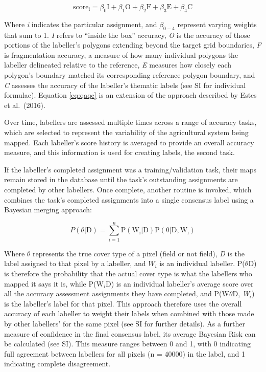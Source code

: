\documentclass[11pt,a4paper]{article}
\begin{document}
\begin{equation} \label{eq:qaqc}
\mathrm{score_i}=\beta_0\mathrm{I}+\beta_1\mathrm{O}+\beta_2\mathrm{F}+\beta_3\mathrm{E}+\beta_4\mathrm{C}
\end{equation}

Where \emph{i} indicates the particular assignment, and \(\beta_{0-4}\)
represent varying weights that sum to 1. \emph{I} refers to ``inside the
box'' accuracy, \emph{O} is the accuracy of those portions of the
labeller's polygons extending beyond the target grid boundaries,
\emph{F} is fragmentation accuracy, a measure of how many individual
polygons the labeller delineated relative to the reference, \emph{E}
measures how closely each polygon's boundary matched its corresponding
reference polygon boundary, and \emph{C} assesses the accuracy of the
labeller's thematic labels (see SI for individual formulae). Equation
\ref{eq:qaqc} is an extension of the approach described by Estes et
al.~(2016).

Over time, labellers are assessed multiple times across a range of
accuracy tasks, which are selected to represent the variability of the
agricultural system being mapped. Each labeller's score history is
averaged to provide an overall accuracy measure, and this information is
used for creating labels, the second task.

If the labeller's completed assignment was a training/validation task,
their maps remain stored in the database until the task's outstanding
assignments are completed by other labellers. Once complete, another
routine is invoked, which combines the task's completed assignments into
a single consensus label using a Bayesian merging approach:

\begin{equation}
P(\theta|\mathrm{D})=\sum_{i=1}^{n}\mathrm{P}(\mathrm{W_i}|\mathrm{D})\mathrm{P}(\mathrm{\theta}|\mathrm{D}, \mathrm{W_i})
\end{equation}

Where \(\theta\) represents the true cover type of a pixel (field or not
field), \emph{D} is the label assigned to that pixel by a labeller, and
\(W_i\) is an individual labeller. P(\(\theta\)\textbar D) is therefore
the probability that the actual cover type is what the labellers who
mapped it says it is, while P(W\(_i\)\textbar D) is an individual
labeller's average score over all the accuracy assessment assignments
they have completed, and P(W\(\theta\)\textbar D, \emph{W\(_i\)}) is the
labeller's label for that pixel. This approach therefore uses the
overall accuracy of each labeller to weight their labels when combined
with those made by other labellers' for the same pixel (see SI for
further details). As a further measure of confidence in the final
consensus label, its average Bayesian Risk can be calculated (see SI).
This measure ranges between 0 and 1, with 0 indicating full agreement
between labellers for all pixels (n = 40000) in the label, and 1
indicating complete disagreement.
\end{document}
